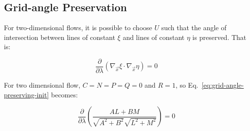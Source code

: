 \subsection{Grid-angle Preservation}
\label{sec:UCS-grid-angle}
For two-dimensional flows, it is possible to choose $U$ such that the angle of intersection between lines of constant $\xi$ and lines of constant $\eta$ is preserved. That is:

\begin{equation}
\label{eq:grid-angle-preserving-init}
\frac{\partial }{{\partial \lambda }}\left( {{\nabla _{\vec x}}\xi  \cdot {\nabla _{\vec x}}\eta } \right) = 0
\end{equation}

For two dimensional flow, $C=N=P=Q=0$ and $R=1$, so Eq.~\ref{eq:grid-angle-preserving-init} becomes:

\begin{equation}
\label{eq:grid-angle-preserving-init-2d}
\frac{\partial }{{\partial \lambda }}\left( {\frac{{AL + BM}}{{\sqrt {{A^2} + {B^2}} \sqrt {{L^2} + {M^2}} }}} \right) = 0
\end{equation}

